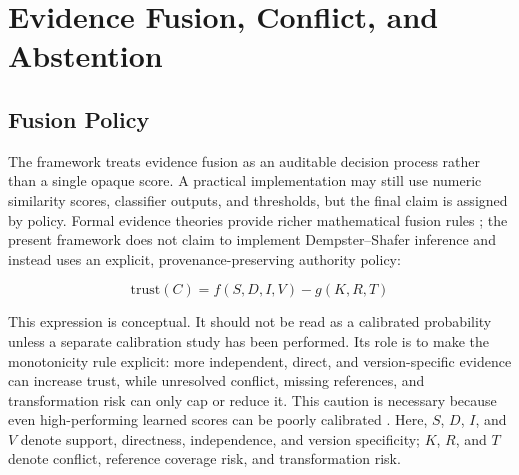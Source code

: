 \section{Evidence Fusion, Conflict, and Abstention}

\subsection{Fusion Policy}

The framework treats evidence fusion as an auditable decision process rather
than a single opaque score. A practical implementation may still use numeric
similarity scores, classifier outputs, and thresholds, but the final claim is
assigned by policy. Formal evidence theories provide richer mathematical
fusion rules \cite{shafer1976evidence}; the present framework does not claim to
implement Dempster--Shafer inference and instead uses an explicit,
provenance-preserving authority policy:

\[
  \text{trust}(C) = f(S,D,I,V) - g(K,R,T)
\]

This expression is conceptual. It should not be read as a calibrated
probability unless a separate calibration study has been performed. Its role
is to make the monotonicity rule explicit: more independent, direct, and
version-specific evidence can increase trust, while unresolved conflict,
missing references, and transformation risk can only cap or reduce it.
This caution is necessary because even high-performing learned scores can be
poorly calibrated \cite{guo2017calibration}.
Here, \(S\), \(D\), \(I\), and \(V\) denote support, directness, independence,
and version specificity; \(K\), \(R\), and \(T\) denote conflict, reference
coverage risk, and transformation risk.

